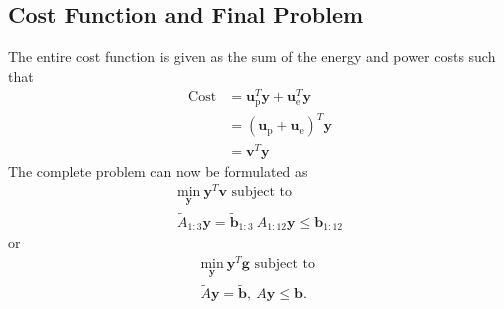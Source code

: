 \subsection{Cost Function and Final Problem}
The entire cost function is given as the sum of the energy and power costs such that
\begin{equation}\begin{aligned}
	\text{Cost} &= \mathbf{u}_{\text{p}}^T\mathbf{y} + \mathbf{u}_{\text{e}}^T\mathbf{y} \\
	            &= \left( \mathbf{u}_{\text{p}} + \mathbf{u}_{\text{e}} \right )^T\mathbf{y} \\
		    &= \mathbf{v}^T\mathbf{y}
\end{aligned}\end{equation}
The complete problem can now be formulated as
\begin{equation}\label{eqn:objective:final}\begin{matrix}
	\underset{\mathbf{y}}{\text{min}} \ \mathbf{y}^T\mathbf{v} \text{ subject to } \\
		\tilde{A}_{1:3}\mathbf{y} = \tilde{\mathbf{b}}_{1:3} \ 
		A_{1:12}\mathbf{y} \le \mathbf{b}_{1:12}
\end{matrix} \end{equation}
or 
\begin{equation}\begin{matrix}
	\underset{\mathbf{y}}{\text{min}} \ \mathbf{y}^T\mathbf{g} \text{ subject to } \\
	\tilde{A}\mathbf{y} = \tilde{\mathbf{b}}, \ A\mathbf{y} \le \mathbf{b}.
\end{matrix} \end{equation}

